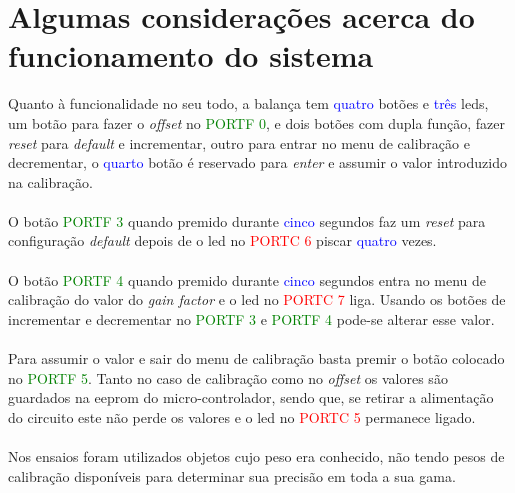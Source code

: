 \section{Algumas considerações acerca do funcionamento do sistema}
Quanto à funcionalidade no seu todo, a balança tem \textcolor{blue}{quatro} botões e \textcolor{blue}{três} \acsp{led}, um botão para fazer o \textit{offset} no \textcolor{green}{PORTF 0}, e dois botões com dupla função, fazer \textit{reset} para \textit{default} e incrementar, outro para entrar no menu de calibração e decrementar, o \textcolor{blue}{quarto} botão é reservado para \textit{enter} e assumir o valor introduzido na calibração.\\
\\
O botão \textcolor{green}{PORTF 3} quando premido durante \textcolor{blue}{cinco} segundos faz um \textit{reset} para configuração \textit{default} depois de o \acs{led} no \textcolor{red}{PORTC 6} piscar \textcolor{blue}{quatro} vezes.\\
\\
O botão \textcolor{green}{PORTF 4} quando premido durante \textcolor{blue}{cinco} segundos entra no menu de calibração do valor do \textit{gain factor} e o \acs{led} no \textcolor{red}{PORTC 7} liga. Usando os botões de incrementar e decrementar no
\textcolor{green}{PORTF 3} e \textcolor{green}{PORTF 4} pode-se alterar esse valor.\\
\\
Para assumir o valor e sair do menu de calibração basta premir o botão colocado no \textcolor{green}{PORTF 5}. Tanto no caso de calibração como no \textit{offset} os valores são guardados na \acs{eeprom} do micro-controlador, sendo que, se retirar a alimentação do circuito este não perde os valores e o \acs{led} no \textcolor{red}{PORTC 5} permanece ligado.
\\
\\
Nos ensaios foram utilizados objetos cujo peso era conhecido, não tendo pesos de calibração disponíveis para determinar sua precisão em toda a sua gama.
